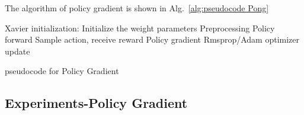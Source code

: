 The algorithm of policy gradient is shown in Alg.~\ref{alg:pseudocode Pong}

\begin{algorithm}[H]
\begin{algorithmic}[1]
\STATE Xavier initialization: Initialize the weight parameters
\STATE Preprocessing 
\STATE Policy forward
\STATE Sample action, receive reward
\STATE Policy gradient
\STATE Rmsprop/Adam optimizer update
\ENDIF
\ENDWHILE
\end{algorithmic}
\caption{pseudocode for Policy Gradient }
\label{alg:pseudocode Pong}
\end{algorithm}

\subsection{Experiments-Policy Gradient}



